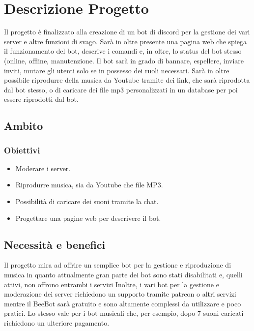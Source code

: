 \newpage


\newpage
\section{Descrizione Progetto\label{section:index}}
Il progetto è finalizzato alla creazione di un bot di discord per la gestione dei vari server e altre funzioni di svago.
Sarà in oltre presente una pagina web che spiega il funzionamento del bot, descrive i comandi e, in oltre, lo status del bot stesso (online, offline, manutenzione.
Il bot sarà in grado di bannare, espellere, inviare inviti, mutare gli utenti solo se in possesso dei ruoli necessari. Sarà in oltre possibile riprodurre della musica da Youtube tramite dei link, che sarà riprodotta dal bot stesso, o di caricare dei file mp3 personalizzati in un database per poi essere riprodotti dal bot.

\subsection{Ambito}
\subsubsection{Obiettivi \label{subsection:goals}}
\begin{itemize}
    \item Moderare i server.
    \item Riprodurre musica, sia da Youtube che file MP3.
    \item Possibilità di caricare dei suoni tramite la chat.
    \item Progettare una pagine web per descrivere il bot.
\end{itemize}


\subsection{Necessità e benefici}
Il progetto mira ad offrire un semplice bot per la gestione e riproduzione di musica in quanto attualmente gran parte dei bot sono stati disabilitati e, quelli attivi, non offrono entrambi i servizi
Inoltre, i vari bot per la gestione e moderazione dei server richiedono un supporto tramite patreon o altri servizi mentre il BeeBot sarà gratuito e sono altamente complessi da utilizzare e poco pratici.
Lo stesso vale per i bot musicali che, per esempio, dopo 7 suoni caricati richiedono un ulteriore pagamento.

